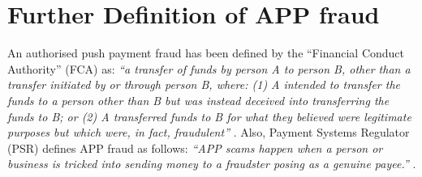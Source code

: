 
\section{Further Definition of APP fraud}\label{sec::APP-fraud-def}


An authorised push payment fraud has been defined by the ``Financial Conduct Authority'' (FCA) as: 
%
\emph{ ``a transfer of funds by person A to person B, other than a transfer initiated by or through person B, where: (1) A intended to transfer the funds to a person other than B but was instead deceived into transferring the funds to B; or (2) A transferred funds to B for what they believed were legitimate purposes but which were, in fact, fraudulent''} \cite{FCA-Glossary}.  
%
Also, Payment Systems Regulator (PSR) defines APP fraud as follows:  
%
\emph{``APP scams happen when a person or business is tricked into sending money to a fraudster posing as a genuine payee.''} \cite{PSR-APP-def}. 